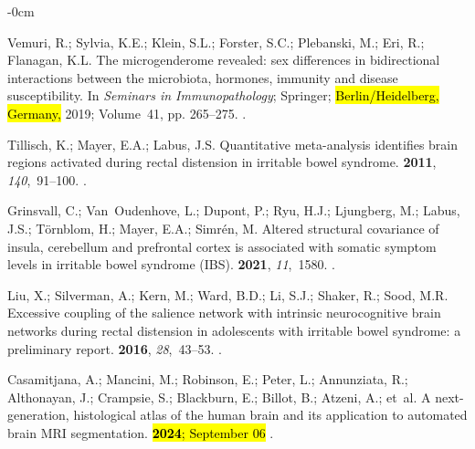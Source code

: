 \documentclass[diagnostics,article,accept,pdftex,moreauthors]{Definitions/mdpi}
\begin{document}
\begin{adjustwidth}{-\extralength}{0cm}
\begin{thebibliography}{999}
Vemuri, R.; Sylvia, K.E.; Klein, S.L.; Forster, S.C.; Plebanski, M.; Eri, R.;
  Flanagan, K.L.
\newblock The microgenderome revealed: sex differences in bidirectional
  interactions between the microbiota, hormones, immunity and disease
  susceptibility.
\newblock In \emph{Seminars in Immunopathology}; Springer;  \hl{Berlin/Heidelberg, Germany,} %
  2019;
  Volume~41, pp. 265--275.
.

Tillisch, K.; Mayer, E.A.; Labus, J.S.
\newblock Quantitative meta-analysis identifies brain regions activated during
  rectal distension in irritable bowel syndrome.
 {\bf 2011}, {\em 140},~91--100.
.

Grinsvall, C.; Van~Oudenhove, L.; Dupont, P.; Ryu, H.J.; Ljungberg, M.; Labus,
  J.S.; T{\"o}rnblom, H.; Mayer, E.A.; Simr{\'e}n, M.
\newblock Altered structural covariance of insula, cerebellum and prefrontal
  cortex is associated with somatic symptom levels in irritable bowel syndrome
  (IBS).
 {\bf 2021}, {\em 11},~1580.
.

Liu, X.; Silverman, A.; Kern, M.; Ward, B.D.; Li, S.J.; Shaker, R.; Sood, M.R.
\newblock Excessive coupling of the salience network with intrinsic
  neurocognitive brain networks during rectal distension in adolescents with
  irritable bowel syndrome: a preliminary report.
 {\bf 2016}, {\em 28},~43--53.
.

Casamitjana, A.; Mancini, M.; Robinson, E.; Peter, L.; Annunziata, R.;
  Althonayan, J.; Crampsie, S.; Blackburn, E.; Billot, B.; Atzeni, A.;  et~al.
\newblock A next-generation, histological atlas of the human brain and its
  application to automated brain {MRI} segmentation.
 \hl{{\bf 2024}; September 06} %
.

\end{thebibliography}




\PublishersNote{}
\end{adjustwidth}
\end{document}
